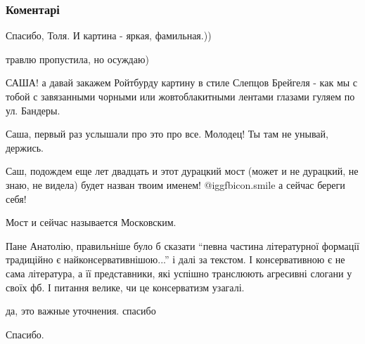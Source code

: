  
 
 
 
 
\subsubsection{Коментарі}
\label{sec:12_12_2016.fb.uljanov_anatolij.1.travlja_kabanov.cmt}

\begin{itemize} %

Спасибо, Толя. И картина - яркая, фамильная.))

\begin{itemize} %
травлю пропустила, но осуждаю)


САША! а давай закажем Ройтбурду картину в стиле Слепцов Брейгеля - как мы с
тобой с завязанными чорными или жовтоблакитными лентами глазами гуляем по ул.
Бандеры.

Саша, первый раз услышали про это про все. Молодец! Ты там не унывай, держись.
\end{itemize} %


Саш, подождем еще лет двадцать и этот дурацкий мост (может и не дурацкий, не
знаю, не видела) будет назван твоим именем!  @igg{fbicon.smile}  а сейчас береги себя!

\begin{itemize} %
Мост и сейчас называется Московским.
\end{itemize} %


Пане Анатолію, правильніше було б сказати \enquote{певна частина літературної формації
традиційно є найконсервативнішою...} і далі за текстом. І консервативною є не
сама література, а її представники, які успішно транслюють агресивні слогани у
своїх фб. І питання велике, чи це консерватизм узагалі.

да, это важные уточнения. спасибо

Спасибо.


\end{itemize}
